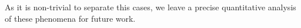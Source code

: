 As it is non-trivial to separate this cases, we leave a precise quantitative analysis of these phenomena for future work.


%

